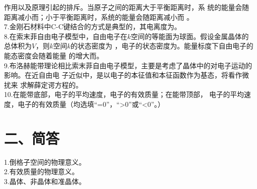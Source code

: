 \documentclass[UTF8]{ctexart}
\begin{document}
\uline{\mbox{\hspace{6em}}}作用以及\uline{\mbox{\hspace{7em}}}原理引起的排斥。当原子之间的距离大于平衡距离时，系
统的能量会随距离减小而\uline{\mbox{\hspace{3em}}}；小于平衡距离时，系统的能量会随距离减小而
\uline{\mbox{\hspace{3em}}}。\\
7.金刚石材料中C-C键结合的方式是典型的\uline{\mbox{\hspace{6em}}}，其电离度为\uline{\mbox{\hspace{2em}}}。\\
8.在索末菲自由电子模型中，自由电子在$k$空间的等能面为球面。假设金属晶体的总体积为$V$，则$k$空间$k$的状态密度为
\uline{\mbox{\hspace{5em}}}，电子的状态密度为\uline{\mbox{\hspace{5em}}}。能量标度下自由电子的能态密度会随着能量
的增大而\uline{\mbox{\hspace{3em}}}。\\
9.布洛赫能带理论相比索末菲自由电子模型，主要是考虑了晶体中的\uline{\mbox{\hspace{7em}}}对电子运动的影响。在近自由电
子近似中，是以\uline{\mbox{\hspace{3em}}}电子的本征值和本征函数作为基态，将\uline{\mbox{\hspace{10em}}}看作微扰来
求解薛定谔方程的。\\
10.在能带底部，电子的平均速度\uline{\mbox{\hspace{3em}}}，电子的有效质量\uline{\mbox{\hspace{3em}}}；在能带顶部，
电子的平均速度\uline{\mbox{\hspace{3em}}}，电子的有效质量\uline{\mbox{\hspace{3em}}}（均选填“=0”，“>0”或“<0”。）\\
\section*{\bfseries 二、简答}
1.倒格子空间的物理意义。\\
2.有效质量的物理意义。\\
3.晶体、非晶体和准晶体。\\
\end{document}
